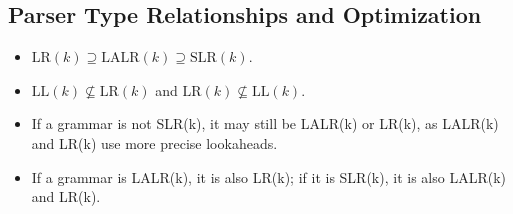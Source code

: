 \subsection{Parser Type Relationships and Optimization}

\begin{itemize}
    \item \(\text{LR}(k) \supseteq \text{LALR}(k) \supseteq \text{SLR}(k)\).
    \item \(\text{LL}(k) \not\subseteq \text{LR}(k)\) and \(\text{LR}(k) \not\subseteq \text{LL}(k)\).
    \item If a grammar is not SLR(k), it may still be LALR(k) or LR(k), as LALR(k) and LR(k) use more precise lookaheads.
    \item If a grammar is LALR(k), it is also LR(k); if it is SLR(k), it is also LALR(k) and LR(k).
\end{itemize}

